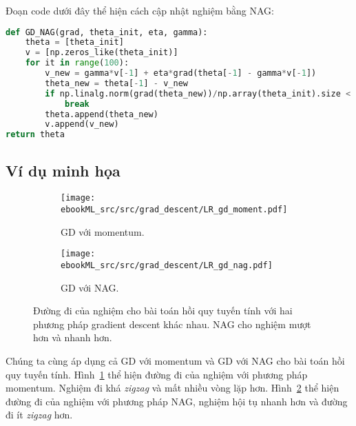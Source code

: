 

Đoạn code dưới đây thể hiện cách cập nhật nghiệm bằng NAG:
\begin{lstlisting}[language=Python]
def GD_NAG(grad, theta_init, eta, gamma):
    theta = [theta_init]
    v = [np.zeros_like(theta_init)]
    for it in range(100):
        v_new = gamma*v[-1] + eta*grad(theta[-1] - gamma*v[-1])
        theta_new = theta[-1] - v_new
        if np.linalg.norm(grad(theta_new))/np.array(theta_init).size < 1e-3:
            break
        theta.append(theta_new)
        v.append(v_new)
return theta
\end{lstlisting}

\subsection{Ví dụ minh họa }

\begin{figure}[t]
\begin{subfigure}{0.49\textwidth}
\texttt{[image: ebookML\_src/src/grad\_descent/LR\_gd\_moment.pdf]}
\caption{GD với momentum.}
\label{fig:8_momentnaga}
\end{subfigure}
\begin{subfigure}{0.49\textwidth}
\texttt{[image: ebookML\_src/src/grad\_descent/LR\_gd\_nag.pdf]}
\caption{GD với NAG.}
\label{fig:8_momentnagb}
\end{subfigure}
\caption{
Đường đi của nghiệm cho bài toán hồi quy tuyến tính với hai phương pháp
gradient descent khác nhau. NAG cho nghiệm mượt hơn và nhanh hơn.
}
\label{fig:8_momentnag}
\end{figure}


Chúng ta cùng áp dụng cả GD với momentum và GD với NAG cho bài toán hồi quy
tuyến tính. Hình~\ref{fig:8_momentnaga} thể hiện đường đi của nghiệm với phương
pháp momentum. Nghiệm đi khá \textit{zigzag} và mất nhiều vòng lặp hơn.
Hình~\ref{fig:8_momentnagb} thể hiện đường đi của nghiệm với phương pháp NAG,
nghiệm hội tụ nhanh hơn và đường đi ít \textit{zigzag} hơn.







